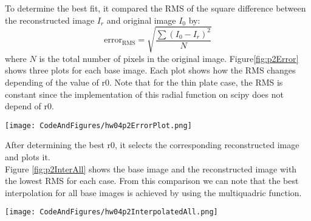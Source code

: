 To determine the best fit, it compared the RMS of the square difference between the reconstructed image $I_r$ and original image $I_0$ by:
\begin{equation}
    \mathrm{error}_\mathrm{RMS}=\sqrt{\frac{\sum(I_0 - I_r)^2}{N}}
\end{equation}
where $N$ is the total number of pixels in the original image. 
Figure\ref{fig:p2Error} shows three plots for each base image. Each plot shows how the RMS changes depending of the value of r0. Note that for the thin plate case, the RMS is constant since the implementation of this radial function on scipy does not depend of r0.  
\begin{figure*}
    \centering
    \texttt{[image: CodeAndFigures/hw04p2ErrorPlot.png]}
    \caption{Plot that showed the RMS values  }
    \label{fig:p2Error}
\end{figure*}

After determining the best r0, it selects the corresponding reconstructed image and plots it. \\
Figure \ref{fig:p2InterAll} shows the base image and the reconstructed image with the lowest RMS for each case. From this comparison we can note that the best interpolation for all base images is achieved by using the multiquadric function. 

\begin{figure*}
    \centering
    \texttt{[image: CodeAndFigures/hw04p2InterpolatedAll.png]}
    \caption{Base Image and the best reconstructed image with the lowest RMS. It shows the corresponding error RMS achieved for each case and the optimal r0 for the multiquadric and inverse radial functions.}
    \label{fig:p2InterAll}
\end{figure*}